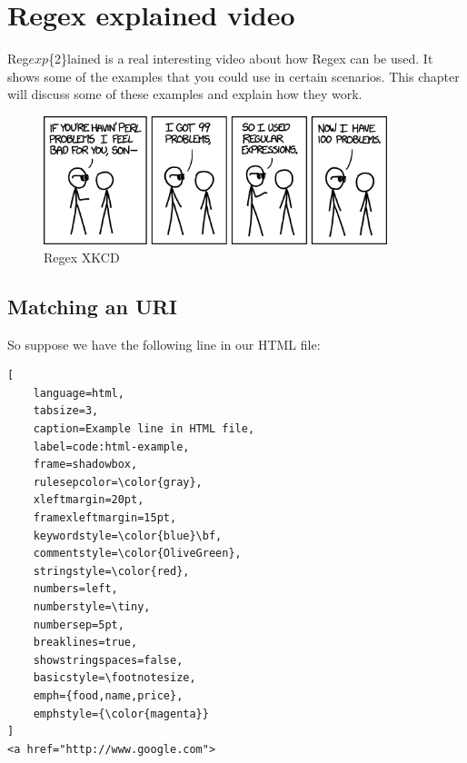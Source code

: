 \chapter{Regex explained video}
\label{chap:regex-explained}

Reg\(exp\)\{2\}lained \cite{regex-explained} is a real interesting video about how Regex can be used. It shows some of the examples that you could use in certain scenarios. This chapter will discuss some of these examples and explain how they work.

\begin{figure}[ht]
\begin{center}
\includegraphics[width=10cm]{Chapters/04_perl_problems.png}
\end{center}
\caption{Regex XKCD\footnotemark}
\label{img:regex-xkcd}
\end{figure}


\section{Matching an URI}
\label{sec:matching-an-uri}
So suppose we have the following line in our HTML file:
\begin{lstlisting}[
	language=html,
	tabsize=3,
	caption=Example line in HTML file,
	label=code:html-example,
	frame=shadowbox,
	rulesepcolor=\color{gray},
	xleftmargin=20pt,
	framexleftmargin=15pt,
	keywordstyle=\color{blue}\bf,
	commentstyle=\color{OliveGreen},
	stringstyle=\color{red},
	numbers=left,
	numberstyle=\tiny,
	numbersep=5pt,
	breaklines=true,
	showstringspaces=false,
	basicstyle=\footnotesize,
	emph={food,name,price},
	emphstyle={\color{magenta}}
]
<a href="http://www.google.com">
\end{lstlisting}

